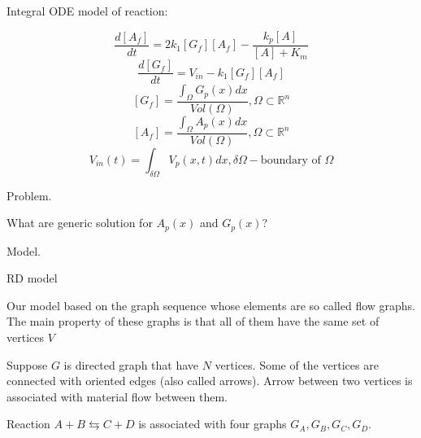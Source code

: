 \documentclass[11pt,a4paper]{article}
\author{Irus Grinis}
\begin{document}
Integral ODE model of reaction:


$$ \frac{d[A_f]}{dt} = 2k_1[G_f][A_f] - \frac{k_p[A]}{[A]+K_m}$$ 
$$ \frac{d[G_f]}{dt} = V_{in} - k_1[G_f][A_f]$$
$$ [G_f] = \frac{\int_{\Omega} G_p(x)dx}{Vol(\Omega)}, \Omega \subset \mathbb{R}^n $$
$$ [A_f] = \frac{\int_{\Omega} A_p(x)dx}{Vol(\Omega)}, \Omega \subset \mathbb{R}^n $$
$$ V_{in}(t) = \int_{\delta \Omega} V_p(x,t)dx, \delta \Omega - \mbox{boundary of } \Omega $$

Problem.

What are generic solution for $A_p(x)$ and $G_p(x)$?
 
Model.

 
%
%
%
%
%
%
%
%
%


RD model

Our model based on the graph sequence whose elements are so called flow graphs.  The main property of these graphs is that all of them have the same set of vertices $V$

Suppose $G$ is directed graph that have $N$ vertices. Some of the vertices are connected with oriented edges (also called arrows). Arrow between two vertices is associated with material flow between them.

Reaction $A+B \leftrightarrows C+D$ is associated with four graphs 
$G_A, G_B, G_C, G_D$.
\end{document}

